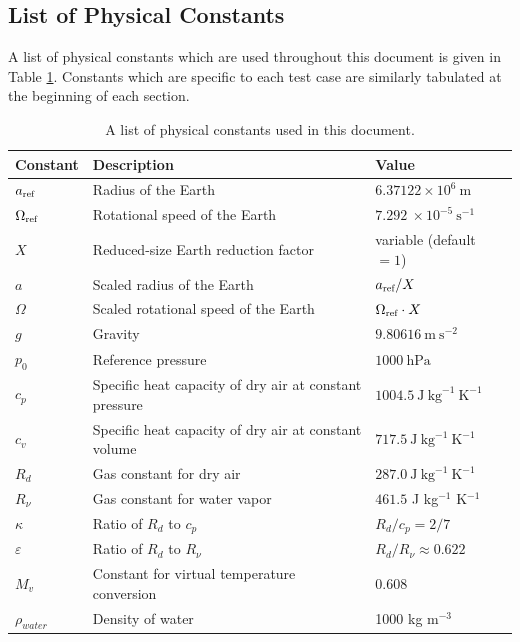 \documentclass[times,doublespace]{fldauth}
\begin{document}
\subsection{List of Physical Constants}
A list of physical constants which are used throughout this document is given in Table \ref{tab:PhysicalConstants}.  Constants which are specific to each test case are similarly tabulated at the beginning of each section.

\begin{table}[h]
\caption{A list of physical constants used in this document.} \label{tab:PhysicalConstants}
\begin{tabular*}{\textwidth}{@{\extracolsep{\fill}}lll}
\hline Constant & Description & Value \\
\hline $a_{\tiny \mbox{ref}}$ & Radius of the Earth & $6.37122 \times 10^{6}\ \mbox{m}$ \\
$\Omega_{\tiny \mbox{ref}}$ & Rotational speed of the Earth & $7.292\ \times 10^{-5}\ \mbox{s}^{-1}$ \\
$X$ & Reduced-size Earth reduction factor & variable (default $= 1$) \\
$a$ & Scaled radius of the Earth & $a_{\tiny \mbox{ref}} / X$ \\
$\Omega$ & Scaled rotational speed of the Earth & $\Omega_{\tiny \mbox{ref}} \cdot X$ \\
$g$ & Gravity & $9.80616\ \mbox{m}\ \mbox{s}^{-2}$ \\
$p_0$ & Reference pressure & $1000\ \mbox{hPa}$ \\
$c_p$ & Specific heat capacity of dry air at constant pressure & $1004.5\ \mbox{J}\ \mbox{kg}^{-1}\ \mbox{K}^{-1}$ \\
$c_v$ & Specific heat capacity of dry air at constant volume & $717.5\ \mbox{J}\ \mbox{kg}^{-1}\ \mbox{K}^{-1}$ \\
$R_d$ & Gas constant for dry air & $287.0\ \mbox{J}\ \mbox{kg}^{-1}\ \mbox{K}^{-1}$ \\
$R_\nu$ & Gas constant for water vapor & $461.5$ J kg$^{-1}$ K$^{-1}$ \\
$\kappa$ & Ratio of $R_d$ to $c_p$ & $R_d/c_p = 2/7$ \\
$\varepsilon$ & Ratio of $R_d$ to $R_\nu$ & $R_d/R_\nu \approx 0.622$ \\
$M_v$ & Constant for virtual temperature conversion & $0.608$ \\
$\rho_{water}$ & Density of water & 1000 kg m$^{-3}$ \\
\hline 
\end{tabular*}

\end{table}
\end{document}
